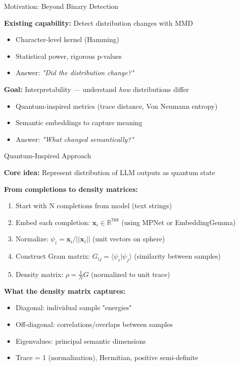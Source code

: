 \documentclass[aspectratio=169,11pt]{beamer}
\newcommand{\good}{\textcolor{darkgreen}{\ding{51}}}
\begin{document}
\begin{frame}{Motivation: Beyond Binary Detection}

\textbf{Existing capability:} Detect distribution changes with MMD
\begin{itemize}
  \item Character-level kernel (Hamming)
  \item Statistical power, rigorous p-values
  \item Answer: \emph{"Did the distribution change?"} \good
\end{itemize}

\vspace{1em}

\textbf{Goal:} Interpretability — understand \emph{how} distributions differ
\begin{itemize}
  \item Quantum-inspired metrics (trace distance, Von Neumann entropy)
  \item Semantic embeddings to capture meaning
  \item Answer: \emph{"What changed semantically?"}
\end{itemize}

\end{frame}

\begin{frame}{Quantum-Inspired Approach}

\textbf{Core idea:} Represent distribution of LLM outputs as quantum state

\vspace{0.5em}

\textbf{From completions to density matrices:}
\begin{enumerate}
  \item Start with N completions from model (text strings)
  \item Embed each completion: $\mathbf{x}_i \in \mathbb{R}^{768}$ (using MPNet or EmbeddingGemma)
  \item Normalize: $\psi_i = \mathbf{x}_i / ||\mathbf{x}_i||$ (unit vectors on sphere)
  \item Construct Gram matrix: $G_{ij} = \langle \psi_i | \psi_j \rangle$ (similarity between samples)
  \item Density matrix: $\rho = \frac{1}{N} G$ (normalized to unit trace)
\end{enumerate}

\vspace{0.5em}

\textbf{What the density matrix captures:}
\begin{itemize}
  \item Diagonal: individual sample "energies"
  \item Off-diagonal: correlations/overlaps between samples
  \item Eigenvalues: principal semantic dimensions
  \item Trace = 1 (normalization), Hermitian, positive semi-definite
\end{itemize}

\end{frame}
\end{document}
